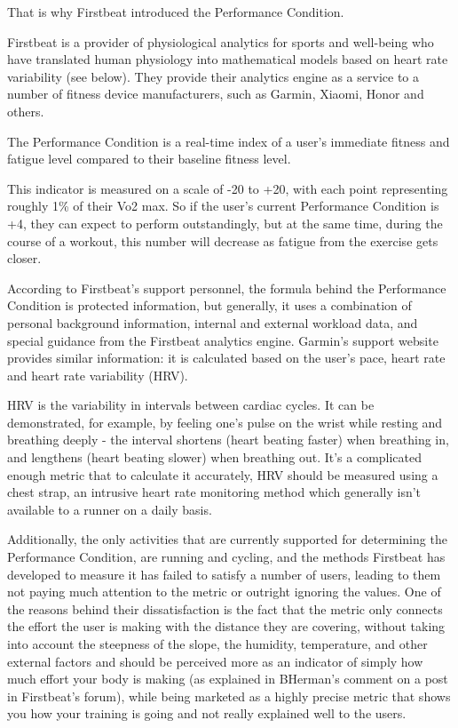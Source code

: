 That is why Firstbeat introduced the Performance Condition.

Firstbeat is a provider of physiological analytics for sports and well-being who have translated human physiology into mathematical models based on heart rate variability (see below).
They provide their analytics engine as a service to a number of fitness device manufacturers, such as Garmin, Xiaomi, Honor and others.

The Performance Condition is a real-time index of a user's immediate fitness and fatigue level compared to their baseline fitness level.

This indicator is measured on a scale of -20 to +20, with each point representing roughly 1\% of their Vo2 max.
So if the user's current Performance Condition is +4, they can expect to perform outstandingly,
but at the same time, during the course of a workout, this number will decrease as fatigue from the exercise gets closer.\cite{performance-condition-firstbeat}\cite{performance-condition-garmin}

According to Firstbeat's support personnel, the formula behind the Performance Condition is protected information,
but generally, it uses a combination of personal background information, internal and external workload data, and special guidance from the Firstbeat analytics engine.\cite{firstbeat-performance-condition-emails}
Garmin's support website provides similar information: it is calculated based on the user's pace, heart rate and heart rate variability (HRV).\cite{performance-condition-garmin}

HRV is the variability in intervals between cardiac cycles.
It can be demonstrated, for example, by feeling one's pulse on the wrist while resting and breathing deeply - the interval shortens (heart beating faster) when breathing in, and lengthens (heart beating slower) when breathing out.\cite{hrv}
It's a complicated enough metric that to calculate it accurately, HRV should be measured using a chest strap,
an intrusive heart rate monitoring method which generally isn't available to a runner on a daily basis.

Additionally, the only activities that are currently supported for determining the Performance Condition, are running and cycling,
and the methods Firstbeat has developed to measure it has failed to satisfy a number of users, leading to them not paying much attention to the metric or outright ignoring the values.\cite{performance-condition-unreliable1}\cite{performance-condition-unreliable-reasoning}
One of the reasons behind their dissatisfaction is the fact that the metric only connects the effort the user is making with the distance they are covering,
 without taking into account the steepness of the slope, the humidity, temperature, and other external factors 
 and should be perceived more as an indicator of simply how much effort your body is making (as explained in BHerman's comment on a post\cite{performance-condition-unreliable-reasoning} in Firstbeat's forum), 
while being marketed as a highly precise metric that shows you how your training is going and not really explained well to the users.

